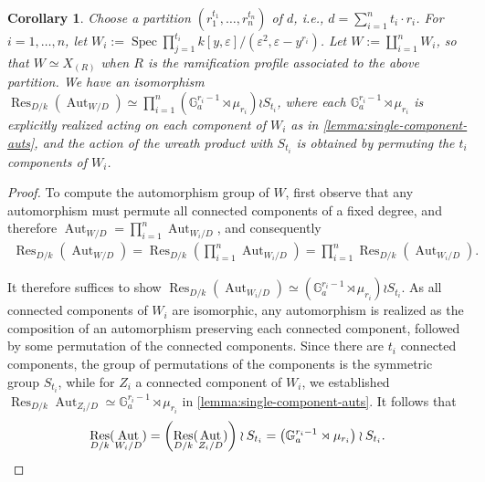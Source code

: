 \documentclass[12 pt]{amsart}
\theoremstyle{plain}
\newtheorem{corollary}[theorem]{Corollary}
\theoremstyle{definition}
\theoremstyle{remark}
\numberwithin{equation}{section}
\newcommand\bg{\mathbb G}
\newcommand\bz{\mathbb Z}
\DeclareMathOperator\spec{\operatorname{Spec}}
\DeclareMathOperator\res{Res}
\DeclareMathOperator\chr{\operatorname{char}}
\DeclareMathOperator\aut{Aut}
\begin{document}
\begin{corollary} \label{corollary:curvilinear-auts}
	Choose a partition $(r_1^{t_1}, \ldots, r_n^{t_n})$ of $d$, i.e., $d =
	\sum_{i=1}^n t_i \cdot r_i$.  For $i = 1, \ldots, n$, let $W_i := \spec
	\prod_{j=1}^{t_i} k[y,\varepsilon]/(\varepsilon^2,
	\varepsilon-y^{r_i})$.  Let $W := \coprod_{i=1}^n W_i$,
	so that $W \simeq X_{(R)}$ when $R$ is the ramification profile associated to
	the above partition.
	We have an isomorphism $\res_{D/k}(\aut_{W/D}) \simeq \prod_{i=1}^n
	\left( \bg_a^{r_i - 1} \rtimes \mu_{r_i} \right) \wr S_{t_i}$, where
	each $\bg_a^{r_i - 1} \rtimes \mu_{r_i}$ is explicitly realized acting
	on each component of $W_i$ as in \autoref{lemma:single-component-auts},
and the action of the wreath product with $S_{t_i}$ is obtained by permuting
the $t_i$ components of $W_i$.  \end{corollary} \begin{proof}

	To compute the automorphism group of $W$, first observe that any
	automorphism must permute all connected components of a fixed degree,
	and therefore $\aut_{W/D} = \prod_{i=1}^n \aut_{W_i/D}$, and
	consequently \begin{align*} \res_{D/k} (\aut_{W/D}) =  \res_{D/k}
		\left(\prod_{i=1}^n \aut_{W_i/D}\right) = \prod_{i=1}^n
		\res_{D/k} (\aut_{W_i/D}).  \end{align*}

	It therefore suffices to show $\res_{D/k}(\aut_{W_i/D}) \simeq \left(
	\bg_a^{r_i - 1} \rtimes \mu_{r_i} \right) \wr S_{t_i}$. As all
	connected components of $W_i$ are isomorphic, any automorphism is
	realized as the composition of an automorphism preserving each
	connected component, followed by some permutation of the connected
	components.  Since there are $t_i$ connected components, the group of
	permutations of the components is the symmetric group $S_{t_i}$, while
	for $Z_i$ a connected component of $W_i$, we established
	$\res_{D/k}\aut_{Z_i/D} \simeq \bg_a^{r_i - 1} \rtimes \mu_{r_i}$ in
	\autoref{lemma:single-component-auts}.  It follows that
	\begin{equation*} 
		\res_{D/k}(\aut_{W_i/D}) = \left(
	\res_{D/k}(\aut_{Z_i/D}) \right) \wr S_{t_i} = \left( \bg_a^{r_i - 1}
\rtimes \mu_{r_i} \right) \wr S_{t_i}. \qedhere 
\end{equation*} 
\end{proof}
\end{document}
